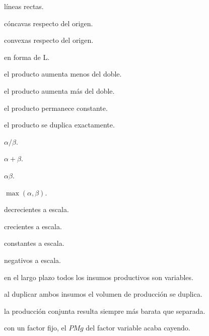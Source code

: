 \begin{opts}
    \item líneas rectas.
    \item cóncavas respecto del origen.
    \item convexas respecto del origen.
    \item en forma de L.
\end{opts}

\begin{opts}
    \item el producto aumenta menos del doble.
    \item el producto aumenta más del doble.
    \item el producto permanece constante.
    \item el producto se duplica exactamente.
\end{opts}

\begin{opts}
    \item $\alpha/\beta$.
    \item $\alpha+\beta$.
    \item $\alpha\beta$.
    \item $\max(\alpha,\beta)$.
\end{opts}

\begin{opts}
    \item decrecientes a escala.
    \item crecientes a escala.
    \item constantes a escala.
    \item negativos a escala.
\end{opts}

\begin{opts}
    \item en el largo plazo todos los insumos productivos son variables.
    \item al duplicar ambos insumos el volumen de producción se duplica.
    \item la producción conjunta resulta siempre más barata que separada.
    \item con un factor fijo, el $PMg$ del factor variable acaba cayendo.
\end{opts}

